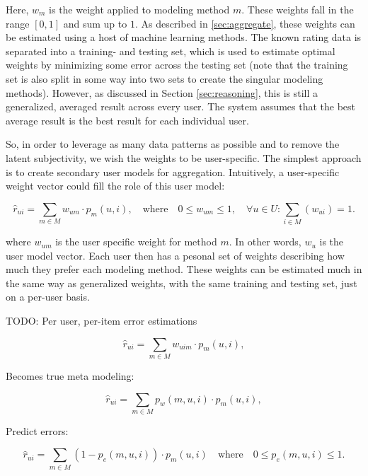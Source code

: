 Here, $w_m$ is the weight applied to modeling method $m$. These weights fall in the range $[0,1]$ and sum up to $1$.
As described in \ref{sec:aggregate}, these weights can be estimated using a host of machine learning methods.
The known rating data is separated into a training- and testing set, which is used to estimate optimal weights
by minimizing some error across the testing set 
(note that the training set is also split in some way into two sets to create the singular modeling methods).
However, as discussed in Section \ref{sec:reasoning},
this is still a generalized, averaged result across every user. 
The system assumes that the best average result is the best result for each individual user.

So, in order to leverage as many data patterns as possible and to remove the latent subjectivity,
we wish the weights to be user-specific. The simplest approach is to create secondary user models for aggregation.
Intuitively, a user-specific weight vector could fill the role of this user model:

\begin{equation*}
  \hat{r}_{ui} = \sum_{m \in M} w_{um} \cdot p_m(u,i),
  \quad \text{where} \quad 0 \leq w_{um} \leq 1, \quad \forall u \in U: \sum_{i \in M} (w_{ui}) = 1.
\end{equation*}

where $w_{um}$ is the user specific weight for method $m$. In other words, $w_{u}$ is the user model vector.
Each user then has a pesonal set of weights describing how much they prefer each modeling method.
These weights can be estimated much in the same way as generalized weights, 
with the same training and testing set, just on a per-user basis.

TODO: Per user, per-item error estimations

\begin{equation*}
  \hat{r}_{ui} = \sum_{m \in M} w_{uim} \cdot p_m(u,i),
\end{equation*}

Becomes true meta modeling:

\begin{equation*}
  \hat{r}_{ui} = \sum_{m \in M} p_{w}(m,u,i) \cdot p_m(u,i),
\end{equation*}

Predict errors:

\begin{equation*}
  \hat{r}_{ui} = \sum_{m \in M} (1 - p_{e}(m,u,i)) \cdot p_m(u,i)
  \quad \text{where} \quad 
  0 \leq p_{e}(m,u,i) \leq 1.
\end{equation*}





